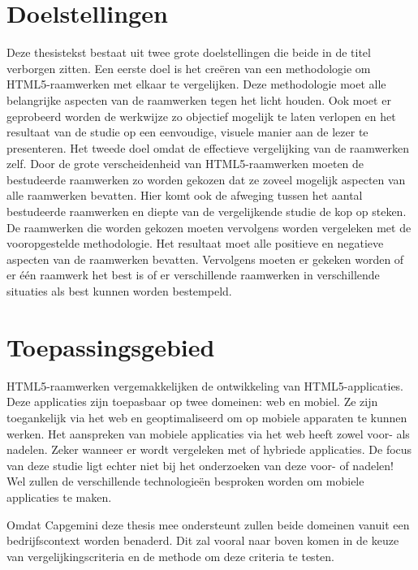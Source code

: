 \section{Doelstellingen} %
Deze thesistekst bestaat uit twee grote doelstellingen die beide in de titel verborgen zitten.
Een eerste doel is het creëren van een methodologie om HTML5-raamwerken met elkaar te vergelijken.
Deze methodologie moet alle belangrijke aspecten van de raamwerken tegen het licht houden.
Ook moet er geprobeerd worden de werkwijze zo objectief mogelijk te laten verlopen en het resultaat van de studie op een eenvoudige,  visuele manier aan de lezer te presenteren.
Het tweede doel omdat de effectieve vergelijking van de raamwerken zelf.
Door de grote verscheidenheid van HTML5-raamwerken moeten de bestudeerde raamwerken zo worden gekozen dat ze zoveel mogelijk aspecten van alle raamwerken bevatten.
Hier komt ook de afweging tussen het aantal bestudeerde raamwerken en diepte van de vergelijkende studie de kop op steken.
De raamwerken die worden gekozen moeten vervolgens worden vergeleken met de vooropgestelde methodologie.
Het resultaat moet alle positieve en negatieve aspecten van de raamwerken bevatten.
Vervolgens moeten er gekeken worden of er één raamwerk het best is of er verschillende raamwerken in verschillende situaties als best kunnen worden bestempeld.

\section{Toepassingsgebied} %
HTML5-raamwerken vergemakkelijken de ontwikkeling van HTML5-applicaties.
Deze applicaties zijn toepasbaar op twee domeinen: web en mobiel.
Ze zijn toegankelijk via het web en geoptimaliseerd om op mobiele apparaten te kunnen werken.
Het aanspreken van mobiele applicaties via het web heeft zowel voor- als nadelen.
Zeker wanneer er wordt vergeleken met  of hybriede applicaties.
De focus van deze studie ligt echter niet bij het onderzoeken van deze voor- of nadelen!
Wel zullen de verschillende technologieën besproken worden om mobiele applicaties te maken.

Omdat Capgemini deze thesis mee ondersteunt zullen beide domeinen vanuit een bedrijfscontext worden benaderd.
Dit zal vooral naar boven komen in de keuze van vergelijkingscriteria en de methode om deze criteria te testen.


